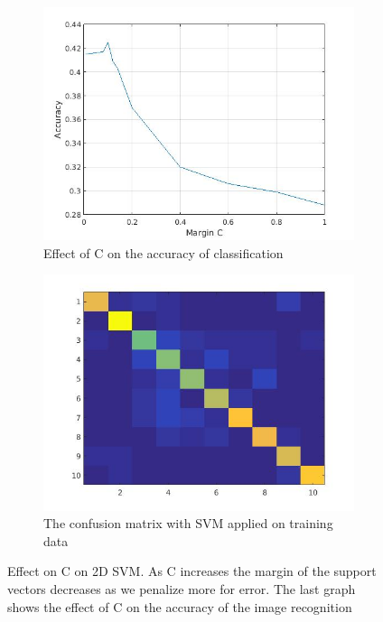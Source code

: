 \documentclass{article} %
\begin{document}
\begin{figure}
\begin{subfigure}{0.50\textwidth}
\centering
\includegraphics[scale=0.2]{images/c-vs-accuracy}
\caption{Effect of C on the accuracy of classification}
\label{fig:cvsaccuracy}
\end{subfigure}
\begin{subfigure}{0.50\textwidth}
\centering
\includegraphics[scale=0.2]{images/svm_confusion}
\caption{The confusion matrix with SVM applied on training data}
\end{subfigure}
\caption{Effect on C on 2D SVM. As C increases the margin of the support vectors decreases as we penalize more for error. The last graph shows the effect of C on the accuracy of the image recognition}
\label{fig:svmconfusion}
\end{figure}
\end{document}
